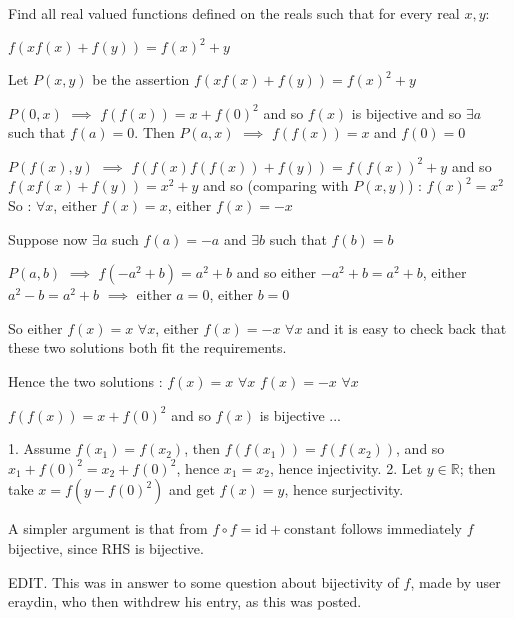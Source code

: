 \begin{solution}
	\begin{tcolorbox}Find all real valued functions defined on the reals such that for every real $ x,y$: 

$ f(xf(x) + f(y)) = f(x)^2 + y$\end{tcolorbox}

Let $ P(x,y)$ be the assertion $ f(xf(x)+f(y))=f(x)^2+y$

$ P(0,x)$ $ \implies$ $ f(f(x))=x+f(0)^2$ and so $ f(x)$ is bijective and so $ \exists a$ such that $ f(a)=0$. 
Then $ P(a,x)$ $ \implies$ $ f(f(x))=x$ and $ f(0)=0$

$ P(f(x),y)$ $ \implies$ $ f(f(x)f(f(x))+f(y))=f(f(x))^2+y$ and so $ f(xf(x)+f(y))=x^2+y$ and so (comparing with $ P(x,y)$) : $ f(x)^2=x^2$
So : $ \forall x$, either $ f(x)=x$, either $ f(x)=-x$

Suppose now $ \exists a$ such $ f(a)=-a$ and $ \exists b$ such that $ f(b)=b$

$ P(a,b)$ $ \implies$ $ f(-a^2+b)=a^2+b$ and so either $ -a^2+b=a^2+b$, either $ a^2-b=a^2+b$ $ \implies$ either $ a=0$, either $ b=0$

So either $ f(x)=x$ $ \forall x$, either $ f(x)=-x$ $ \forall x$ and it is easy to check back that these two solutions both fit the requirements.

Hence the two solutions :
$ f(x)=x$ $ \forall x$
$ f(x)=-x$ $ \forall x$
\end{solution}



\begin{solution}
	\begin{tcolorbox}$ f(f(x))=x+f(0)^2$ and so $ f(x)$ is bijective ...\end{tcolorbox}
1. Assume $f(x_1) = f(x_2)$, then $f(f(x_1)) = f(f(x_2))$, and so $x_1 + f(0)^2 = x_2 + f(0)^2$, hence $x_1 = x_2$, hence injectivity.
2. Let $y\in \mathbb{R}$; then take $x = f(y-f(0)^2)$ and get $f(x) = y$, hence surjectivity.

A simpler argument is that from $f\circ f = \textrm{id} + \textrm{constant}$ follows immediately $f$ bijective, since RHS is bijective.

EDIT. This was in answer to some question about bijectivity of $f$, made by user eraydin, who then withdrew his entry, as this was posted.
\end{solution}



